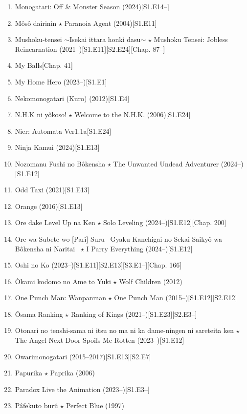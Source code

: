 \documentclass{article}
\begin{document}
\begin{enumerate}
    \item Monogatari: Off \& Monster Season (2024)\hfill[S1.E14--]
    \item {\sc Môsô dairinin $\star$ Paranoia Agent} (2004)\hfill[S1.E11]
    \item Mushoku-tensei $\sim$Isekai ittara honki dasu$\sim$ $\star$ Mushoku Tensei: Jobless Reincarnation (2021--)\hfill[S1.E11][S2.E24][Chap. 87--]
    \item My Balls\hfill[Chap. 41]
    \item My Home Hero (2023--)\hfill[S1.E1]
    \item {\sc Nekomonogatari (Kuro)} (2012)[S1.E4]
    \item {\sc N.H.K ni yôkoso! $\star$ Welcome to the N.H.K.} (2006)\hfill[S1.E24]
    \item {\sc Nier: Automata Ver1.1a}\hfill[S1.E24]
    \item {\sc Ninja Kamui} (2024)\hfill[S1.E13]
    \item {\sc Nozomanu Fushi no Bôkensha $\star$ The Unwanted Undead Adventurer} (2024--)\hfill[S1.E12]
    \item {\sc Odd Taxi} (2021)\hfill[S1.E13]
    \item {\sc Orange} (2016)\hfill[S1.E13]
    \item {\sc Ore dake Level Up na Ken $\star$ Solo Leveling} (2024--)\hfill[S1.E12][Chap. 200]
    \item {\sc Ore wa Subete wo [Parî] Suru ~Gyaku Kanchigai no Sekai Saikyô wa Bôkensha ni Naritai~ $\star$ I Parry Everything} (2024--)\hfill[S1.E12]
    \item {\sc Oshi no Ko} (2023--)\hfill[S1.E11][S2.E13][S3.E1--][Chap. 166]
    \item {\sc \^Okami kodomo no Ame to Yuki $\star$ Wolf Children} (2012)
    \item One Punch Man: Wanpanman $\star$ One Punch Man (2015--)\hfill[S1.E12][S2.E12]
    \item \^Osama Ranking $\star$ Ranking of Kings (2021--)\hfill[S1.E23][S2.E3--]
    \item Otonari no tenshi-sama ni itsu no ma ni ka dame-ningen ni sareteita ken $\star$ The Angel Next Door Spoils Me Rotten (2023--)\hfill[S1.E12]
    \item {\sc Owarimonogatari} (2015--2017)\hfill[S1.E13][S2.E7]
    \item {\sc Papurika $\star$ Paprika} (2006)
    \item Paradox Live the Animation (2023--)\hfill[S1.E3--]
    \item {\sc Pâfekuto burû $\star$ Perfect Blue} (1997)

\end{enumerate}
\end{document}
